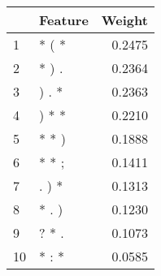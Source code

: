 \begin{tabular}{llr}
\toprule
{} & Feature &  Weight \\
\midrule
1  &   * ( * &  0.2475 \\
2  &   * ) . &  0.2364 \\
3  &   ) . * &  0.2363 \\
4  &   ) * * &  0.2210 \\
5  &   * * ) &  0.1888 \\
6  &   * * ; &  0.1411 \\
7  &   . ) * &  0.1313 \\
8  &   * . ) &  0.1230 \\
9  &   ? * . &  0.1073 \\
10 &   * : * &  0.0585 \\
\bottomrule
\end{tabular}
